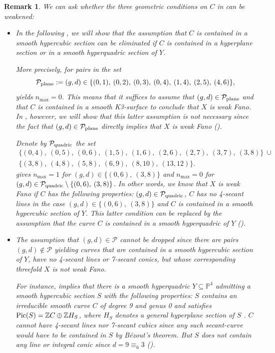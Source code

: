 \documentclass[english,11pt,reqno]{amsart}
\newcommand{\sub}{\subseteq}
\newcommand{\Pfour}{\mathbb{P}^4}
\newcommand{\Z}{\mathbb{Z}}
\newcommand{\Pic}{\textup{Pic}}
\newtheorem{rmk}[thm]{Remark}
\begin{document}
%
%
%
\begin{rmk} We can ask whether the three geometric conditions on $C$ in  can be weakened:
\begin{itemize}
\item In the following , we will show that the assumption that $C$ is contained in a smooth hypercubic section can be eliminated if $C$ is contained in a hyperplane section or in a smooth hyperquadric section of $Y$. \par 
More precisely, for pairs in the set $$\mathcal{P}_{\textup{plane}}:= (g,d)\in\{(0,1),\:(0,2),\:(0,3),\:(0,4),\:(1,4),\:(2,5),\:(4,6)\},$$  yields $n_{\max}=0$. This means that it suffices to assume that  $(g,d)\in \mathcal{P}_{\textup{plane}}$ and that $C$ is contained in a smooth K3-surface to conclude that $X$ is weak Fano. In , however, we will show that this latter assumption is not necessary since the fact that $(g,d)\in \mathcal{P}_{\textup{plane}}$ directly implies that $X$ is weak Fano (). \par 
Denote by $\mathcal{P}_{\textup{quadric}} $ the set \begin{gather*}
	\{ (0,4),\:(0,5),\:(0,6),\:(1,5),\:(1,6),\:(2,6),\:(2,7),\:(3,7),\:(3,8)\} \:\cup 
	\\ \{(3,8),\:(4,8),\:(5,8),\:(6,9),\:(8,10),\:(13,12)\}.
\end{gather*}  gives $n_{\max}=1$ for $(g,d)\in\{(0,6),\:(3,8)\}$ and $n_{\max}=0$ for $(g,d)\in\mathcal{P}_{\textup{quadric}}\setminus \{(0,6),\:(3,8)\}$. In other words, we know that $X$ is weak Fano if $C$ has the following properties: $(g,d)\in \mathcal{P}_{\textup{quadric}}$, $C$ has no 4-secant lines in the case $(g,d)\in\{(0,6),\:(3,8)\}$ and $C$ is contained in a smooth hypercubic section of $Y$. This latter condition can be replaced by the assumption that the curve $C$ is contained in a smooth hyperquadric of $Y$ ().
%
\item The assumption that $(g,d)\in \mathcal{P}$ cannot be dropped since there are pairs $(g,d) \not \in \mathcal{P}$ yielding curves that are contained in a smooth hypercubic section of $Y$, have no 4-secant lines or 7-secant conics, but whose corresponding threefold $X$ is not weak Fano. \par 
For instance,  implies that there is a smooth hyperquadric $Y\sub \Pfour$ admitting a smooth hypercubic section $S$ with the following properties: $S$ contains an irreducible smooth curve $C$ of degree 9 and genus 0 and satisfies $\Pic(S)=\Z C\oplus \Z H_S$, where $H_S$ denotes a general hyperplane section of $S$ . $C$ cannot have 4-secant lines nor 7-secant cubics since any such secant-curve would have to be contained in $S$ by Bézout's theorem. But $S$ does not contain any line or integral conic since $d=9\equiv_6 3$ ().

\end{itemize}
\end{rmk}
\end{document}
